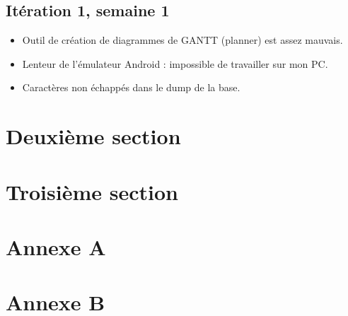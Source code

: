 \documentclass[a4paper,11pt,french]{article}
\begin{document}
\subsection{Itération 1, semaine 1}
\begin{itemize}
\item Outil de création de diagrammes de GANTT (planner) est assez mauvais.
\item Lenteur de l'émulateur Android : impossible de travailler sur mon PC.%
\item Caractères non échappés dans le dump de la base.%
\end{itemize}

\section{Deuxième section}
\section{Troisième section}
\newpage
\appendix
\section{Annexe A}
\section{Annexe B}
\end{document}
